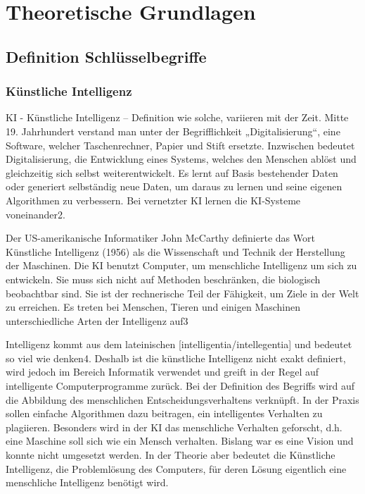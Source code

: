 \chapter{Theoretische Grundlagen}

\section{Definition Schlüsselbegriffe}

\subsection{Künstliche Intelligenz}

KI - Künstliche Intelligenz – Definition wie solche, variieren mit der Zeit. Mitte 19. Jahrhundert verstand man unter der Begrifflichkeit „Digitalisierung“, 
eine Software, welcher Taschenrechner, Papier und Stift ersetzte. Inzwischen bedeutet Digitalisierung, die Entwicklung eines Systems, welches den Menschen ablöst 
und gleichzeitig sich selbst weiterentwickelt. Es lernt auf Basis bestehender Daten oder generiert selbständig neue Daten, um daraus zu lernen und seine 
eigenen Algorithmen zu verbessern. Bei vernetzter KI lernen die KI-Systeme voneinander2.
\newline

Der US-amerikanische Informatiker John McCarthy definierte das Wort Künstliche Intelligenz (1956) als die Wissenschaft und Technik der Herstellung der Maschinen. 
Die KI benutzt Computer, um menschliche Intelligenz um sich zu entwickeln. Sie muss sich nicht auf Methoden beschränken, die biologisch beobachtbar sind. 
Sie ist der rechnerische Teil der Fähigkeit, um Ziele in der Welt zu erreichen. Es treten bei Menschen, Tieren und einigen Maschinen unterschiedliche Arten der 
Intelligenz auf3
\newline

Intelligenz kommt aus dem lateinischen [intelligentia/intellegentia] und bedeutet so viel wie denken4. Deshalb ist die künstliche Intelligenz nicht exakt definiert, 
wird jedoch im Bereich Informatik verwendet und greift in der Regel auf intelligente Computerprogramme zurück. 
Bei der Definition des Begriffs wird auf die Abbildung des menschlichen Entscheidungsverhaltens verknüpft. 
In der Praxis sollen einfache Algorithmen dazu beitragen, ein intelligentes Verhalten zu plagiieren. Besonders wird in der KI das menschliche Verhalten geforscht, 
d.h. eine Maschine soll sich wie ein Mensch verhalten. Bislang war es eine Vision und konnte nicht umgesetzt werden. 
In der Theorie aber bedeutet die Künstliche Intelligenz, die Problemlösung des Computers, für deren Lösung eigentlich eine menschliche Intelligenz benötigt wird. 
\newline

